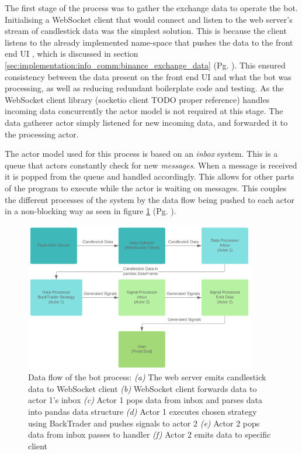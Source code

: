 The first stage of the process was to gather the exchange data to operate the bot. Initialising a WebSocket client that would connect and listen to the web server's stream of candlestick data was the simplest solution. This is because the client listens to the already implemented name-space that pushes the data to the front end UI , which is discussed in section \ref{sec:implementation:info_comm:binance_exchange_data} (Pg. \pageref{sec:implementation:info_comm:binance_exchange_data}). This ensured consistency between the data present on the front end UI and what the bot was processing, as well as reducing redundant boilerplate code and testing. As the WebSocket client library (socketio client TODO proper reference) handles incoming data concurrently the actor model is not required at this stage. The data gatherer actor simply listened for new incoming data, and forwarded it to the processing actor.

The actor model used for this process is based on an \textit{inbox} system. This is a queue that actors constantly check for new \textit{messages}. When a message is received it is popped from the queue and handled accordingly. This allows for other parts of the program to execute while the actor is waiting on messages. This couples the different processes of the system by the data flow being pushed to each actor in a non-blocking way as seen in figure \ref{fig:implementation:actor_dataflow} (Pg. \pageref{fig:implementation:actor_dataflow}). 

\begin{figure}[htb]
    \centering
	\includegraphics[width=0.9\textwidth]{content/graphics/diagrams/actor_dataflow.png}
	\caption{Data flow of the bot process: 
	\textit{(a)} The web server emits candlestick data to WebSocket client
	\textit{(b)} WebSocket client forwards data to actor 1's inbox
    \textit{(c)} Actor 1 pops data from inbox and parses data into pandas data structure
    \textit{(d)} Actor 1 executes chosen strategy using BackTrader and pushes signals to actor 2
    \textit{(e)} Actor 2 pops data from inbox passes to handler
    \textit{(f)} Actor 2 emits data to specific client}
    
	\label{fig:implementation:actor_dataflow}
\end{figure}

